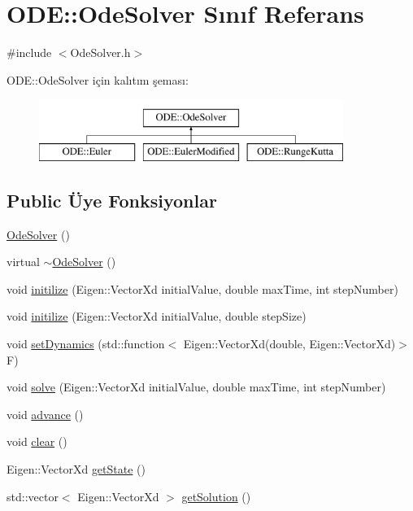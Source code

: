 \hypertarget{classODE_1_1OdeSolver}{}\section{O\+DE\+::Ode\+Solver Sınıf Referans}
\label{classODE_1_1OdeSolver}


{\ttfamily \#include $<$Ode\+Solver.\+h$>$}

O\+DE\+::Ode\+Solver için kalıtım şeması\+:\begin{figure}[H]
\begin{center}
\leavevmode
\includegraphics[height=2.000000cm]{classODE_1_1OdeSolver}
\end{center}
\end{figure}
\subsection*{Public Üye Fonksiyonlar}
\begin{DoxyCompactItemize}
\item 
\mbox{\hyperlink{classODE_1_1OdeSolver_a8a1e1a4d7d4eec40090e95a40f0da601}{Ode\+Solver}} ()
\item 
virtual \mbox{\hyperlink{classODE_1_1OdeSolver_a40eb1af84fe4849368b7957f33eee14c}{$\sim$\+Ode\+Solver}} ()
\item 
void \mbox{\hyperlink{classODE_1_1OdeSolver_a70787647e9c8637197d5c442b7655a05}{initilize}} (Eigen\+::\+Vector\+Xd initial\+Value, double max\+Time, int step\+Number)
\item 
void \mbox{\hyperlink{classODE_1_1OdeSolver_a9410c85bc61707bd2b0ccf6e575b8c5f}{initilize}} (Eigen\+::\+Vector\+Xd initial\+Value, double step\+Size)
\item 
void \mbox{\hyperlink{classODE_1_1OdeSolver_a25386da82d047956226f5b366f36ead8}{set\+Dynamics}} (std\+::function$<$ Eigen\+::\+Vector\+Xd(double, Eigen\+::\+Vector\+Xd)$>$ F)
\item 
void \mbox{\hyperlink{classODE_1_1OdeSolver_a32eaa6cc7975a9e15faf73ec03b7f572}{solve}} (Eigen\+::\+Vector\+Xd initial\+Value, double max\+Time, int step\+Number)
\item 
void \mbox{\hyperlink{classODE_1_1OdeSolver_adc59b7ead56779e625138f334229b370}{advance}} ()
\item 
void \mbox{\hyperlink{classODE_1_1OdeSolver_ac766ba00b92441cc7cfe8b37f0ec9ef0}{clear}} ()
\item 
Eigen\+::\+Vector\+Xd \mbox{\hyperlink{classODE_1_1OdeSolver_a53712a99a5282ac30c53c9016bc540ae}{get\+State}} ()
\item 
std\+::vector$<$ Eigen\+::\+Vector\+Xd $>$ \mbox{\hyperlink{classODE_1_1OdeSolver_a5916469dc1fa28d9ff57e59f6c603a58}{get\+Solution}} ()
\end{DoxyCompactItemize}
